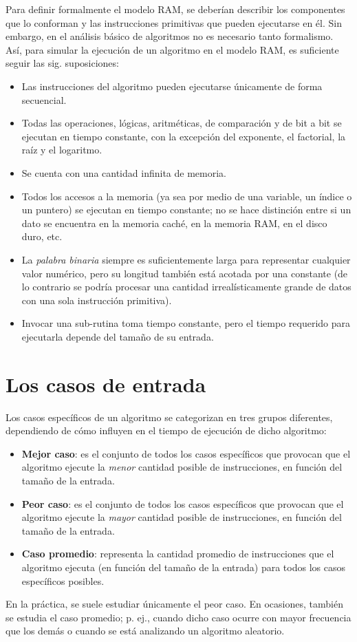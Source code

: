 Para definir formalmente el modelo RAM, se deberían describir los componentes que lo conforman y las instrucciones primitivas que pueden ejecutarse en él. 
Sin embargo, en el análisis básico de algoritmos no es necesario tanto formalismo.
Así, para simular la ejecución de un algoritmo en el modelo RAM, es suficiente seguir las sig. suposiciones:
\begin{itemize}
  \item Las instrucciones del algoritmo pueden ejecutarse únicamente de forma secuencial.
  \item Todas las operaciones, lógicas, aritméticas, de comparación y de bit a bit se ejecutan en tiempo constante, con la excepción del exponente, el factorial, la raíz y el logaritmo.
  \item Se cuenta con una cantidad infinita de memoria. 
  \item Todos los accesos a la memoria (ya sea por medio de una variable, un índice o un puntero) se ejecutan en tiempo constante; no se hace distinción entre si un dato se encuentra en la memoria caché, en la memoria RAM, en el disco duro, etc.
  \item La \emph{palabra binaria} siempre es suficientemente larga para representar cualquier valor numérico, pero su longitud también está acotada por una constante (de lo contrario se podría procesar una cantidad irrealísticamente grande de datos con una sola instrucción primitiva).
  \item Invocar una sub-rutina toma tiempo constante, pero el tiempo requerido para ejecutarla depende del tamaño de su entrada.
\end{itemize}

\section{Los casos de entrada}

Los casos específicos de un algoritmo se categorizan en tres grupos diferentes, dependiendo de cómo influyen en el tiempo de ejecución de dicho algoritmo:
\begin{itemize}
  \item \textbf{Mejor caso}: es el conjunto de todos los casos específicos que provocan que el algoritmo ejecute la \emph{menor} cantidad posible de instrucciones, en función del tamaño de la entrada.
  \item \textbf{Peor caso}: es el conjunto de todos los casos específicos que provocan que el algoritmo ejecute la \emph{mayor} cantidad posible de instrucciones, en función del tamaño de la entrada. 
  \item \textbf{Caso promedio}: representa la cantidad promedio de instrucciones
  que el algoritmo ejecuta (en función del tamaño de la entrada) para todos los casos específicos posibles. 
\end{itemize}
En la práctica, se suele estudiar únicamente el peor caso. 
En ocasiones, también se estudia el caso promedio; p. ej., cuando dicho caso ocurre con mayor frecuencia que los demás o cuando se está analizando un algoritmo aleatorio.

